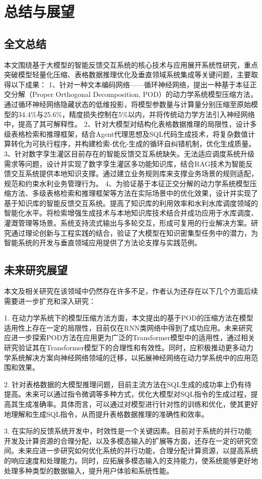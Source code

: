 \chapter{总结与展望}
\label{cha:第六章}
\section{全文总结}
本文围绕基于大模型的智能反馈交互系统的核心技术与应用展开系统性研究，重点突破模型轻量化压缩、表格数据推理优化及垂直领域系统集成等关键问题，主要取得以下成果：    1、针对一种文本编码网络——循环神经网络，提出一种基于本征正交分解（Proper Orthogonal Decomposition, POD）的动力学系统模型压缩方法，通过循环神经网络隐藏状态的低维投影，将模型参数量与计算量分别压缩至原始模型的34.4\%与25.6\%，精度损失控制在5\%以内，并将传统动力学方法引入神经网络中，提高了其可解释性。
2、针对大模型对结构化表格数据推理的局限性，设计多级表格检索和推理框架，结合Agent代理思想及SQL代码生成技术，将复杂数值计算转化为可执行程序，并构建检索-优化-生成的循环自纠错机制，优化生成质量。
3、针对数字孪生灌区目前存在的智能反馈交互系统缺失。无法适应调度系统升级需求等问题，设计并实现了数字孪生灌区多功能知识库，结合RAG技术为智能反馈交互系统提供本地知识支撑。通过建立业务规则库来支撑业务场景的规则适配，规范和约束水利业务管理行为。
4、为验证基于本征正交分解的动力学系统模型压缩方法、多级表格检索和推理框架等方法在实际场景中的优化效果，设计并实现了基于知识库的智能反馈交互系统。提高了知识库的利用效率和水利水库调度领域的智能化水平。将检索增强生成技术与本地知识库技术结合并成功应用于水库调度、灌溉管理等场景。系统支持流式输出与多轮交互，形成可复用的行业解决方案。研究通过理论创新与工程实践的结合，验证了大模型在知识密集型任务中的潜力，为智能系统的开发与垂直领域应用提供了方法论支撑与实践范例。
\section{未来研究展望}
本文及相关研究在该领域中仍然存在许多不足，作者认为还存在以下几个方面后续需要进一步扩充和深入研究：

1.	在动力学系统下的模型压缩方法方面，本文提出的基于POD的压缩方法在模型适用性上存在一定的局限性，目前仅在RNN类网络中得到了成功应用。未来研究应进一步探索POD方法在应用更为广泛的Transformer模型中的适用性，通过相关研究验证其在Transformer模型下的合理性和有效性。同时，应积极推动更多动力学系统解决方案向神经网络领域的迁移，以拓展神经网络在动力学系统中的应用范围和效果。

2.	针对表格数据的大模型推理问题，目前主流方法在SQL生成的成功率上仍有待提高。未来可以通过指令微调等多种方式，优化大模型对SQL指令的生成过程，提高其生成准确率。具体而言，可以通过对模型进行针对性的训练和优化，使其更好地理解和生成SQL指令，从而提升表格数据推理的准确性和效率。

3.	在实际的反馈系统开发中，时效性是一个关键因素。目前对于系统的并行功能开发及计算资源的合理分配，以及多模态输入的扩展等方面，还存在一定的研究空间。未来应进一步研究如何优化系统的并行功能，合理分配计算资源，以提高系统的响应速度和处理能力。同时，应拓展多模态输入的支持能力，使系统能够更好地处理多种类型的数据输入，提升用户体验和系统性能。
